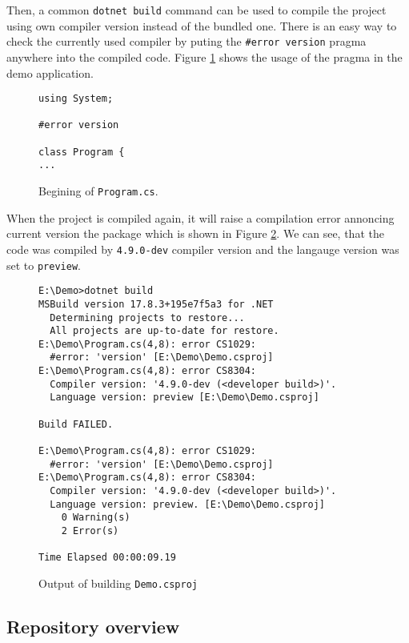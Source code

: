 \par
Then, a common \texttt{dotnet build} command can be used to compile the project using own compiler version instead of the bundled one.
There is an easy way to check the currently used compiler by puting the \texttt{\#error version} pragma anywhere into the compiled code.
Figure \ref{img66:pragma} shows the usage of the pragma in the demo application.
\begin{figure}[h]
\begin{lstlisting}
using System;

#error version

class Program {
...
\end{lstlisting}
\caption{Begining of \texttt{Program.cs}.}
\label{img66:pragma}
\end{figure}
\par
When the project is compiled again, it will raise a compilation error annoncing current version the package which is shown in Figure \ref{img67:output}.
We can see, that the code was compiled by \texttt{4.9.0-dev} compiler version and the langauge version was set to \texttt{preview}. 
\begin{figure}[h]
\begin{lstlisting}
E:\Demo>dotnet build
MSBuild version 17.8.3+195e7f5a3 for .NET
  Determining projects to restore...
  All projects are up-to-date for restore.
E:\Demo\Program.cs(4,8): error CS1029: 
  #error: 'version' [E:\Demo\Demo.csproj]
E:\Demo\Program.cs(4,8): error CS8304: 
  Compiler version: '4.9.0-dev (<developer build>)'. 
  Language version: preview [E:\Demo\Demo.csproj]

Build FAILED.

E:\Demo\Program.cs(4,8): error CS1029: 
  #error: 'version' [E:\Demo\Demo.csproj]
E:\Demo\Program.cs(4,8): error CS8304: 
  Compiler version: '4.9.0-dev (<developer build>)'. 
  Language version: preview. [E:\Demo\Demo.csproj]
    0 Warning(s)
    2 Error(s)

Time Elapsed 00:00:09.19
\end{lstlisting}
\caption{Output of building \texttt{Demo.csproj}}
\label{img67:output}
\end{figure}

\subsection{Repository overview}

